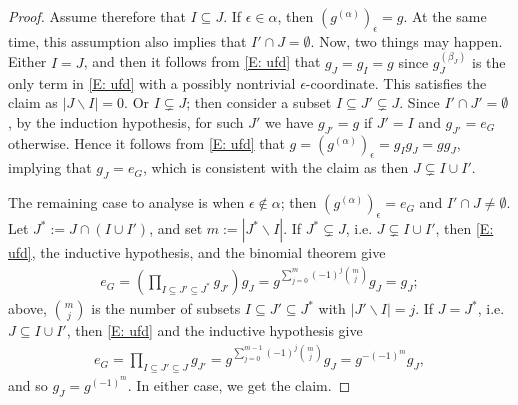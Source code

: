 \documentclass[11pt]{amsart}
\theoremstyle{definition}
\newcommand{\eps}{\epsilon}
\newcommand{\1}{{\mathbf{1}}}
\newcommand{\brac}[1]{\mathopen{}\left( #1 \mathclose{}\right)}
\begin{document}
\begin{proof}
Assume therefore that $I\subseteq J$. If $\eps\in \alpha$, then  $(g^{(\alpha)})_\eps = g$. At the same time, this assumption also implies that $I'\cap J = \emptyset$. Now, two things may happen. Either $I=J$, and then it follows from \eqref{E: ufd} that $g_J = g_I={g}$  {since $g_J^{(\beta_J)}$ is the only term in \eqref{E: ufd} with a possibly nontrivial $\eps$-coordinate.} This satisfies the claim as $|J\backslash I| = 0$.
Or $I\subsetneq J$; then consider a subset $I\subseteq J'\subsetneq J$. {Since $I'\cap J' = \emptyset$,} by the induction hypothesis, for such $J'$ we have $g_{J'} = g$ if $J' = I$ and $g_{J'} = e_G$ otherwise. Hence it follows from \eqref{E: ufd} that $g = (g^{(\alpha)})_\eps = g_I g_J = g g_J$, implying that $g_J = e_G$, which is consistent with the claim as then $J\subsetneq I\cup I'$.

The remaining case to analyse is when $\eps\notin\alpha$; then $(g^{(\alpha)})_\eps = e_G$ and $I'\cap J \neq \emptyset$. Let $J^*:=J\cap(I\cup I')$, and set $m:=|J^*\backslash I|$. If $J^*\subsetneq J$, i.e. $J\subsetneq I\cup I'$, then \eqref{E: ufd}, the inductive hypothesis, and the binomial theorem give
\begin{align*}
    e_G = \brac{\prod_{I\subseteq J'\subseteq J^*} g_{J'}}g_J = g^{\sum\limits_{j=0}^m (-1)^j \binom{m}{j}}g_{J} = g_J;
\end{align*}
above, $\binom{m}{j}$ is the number of subsets $I\subseteq J'\subseteq J^*$ with $|J'\backslash I| = j$. If $J = J^*$, i.e. $J\subseteq I\cup I'$, then \eqref{E: ufd} and the inductive hypothesis give
\begin{align*}
    e_G = \prod_{I\subseteq J'\subseteq J} g_{J'} = g^{\sum\limits_{j=0}^{m-1} (-1)^j \binom{m}{j}}g_{J} = g^{-(-1)^m} g_J,
\end{align*}
and so $g_J = g^{(-1)^{m}}$. In either case, we get the claim.
\end{proof}
\end{document}
